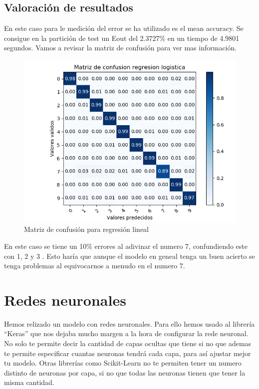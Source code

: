 \documentclass[12pt,a4paper]{article}
\begin{document}
\subsection{Valoración de resultados}
En este caso para le medición del error se ha utilizado es el mean accuracy.
Se consigue en la partición de test un Eout del 2.3727\% en un tiempo de 4.9801 segundos. Vamos a revisar la matriz de confusión para ver mas información.

\begin{figure}[H]
	\centering
	\includegraphics[width=0.7\linewidth]{../imagenesRL/matrizconfusion}
	\caption[Matriz de confusión para regresión lineal]{Matriz de confusión para regresión lineal}
	\label{fig:Matriz confusion RL}
\end{figure}

En este caso se tiene un 10\% errores al adivinar el numero 7, confundiendo este con 1, 2 y 3 . Esto haría que aunque el modelo en geneal tenga un buen acierto se tenga problemas al equivocarnos a menudo en el numero 7.


\section{Redes neuronales}
Hemos relizado un modelo con redes neuronales. Para ello hemos usado al librería ``Keras'' que nos dejaba mucho margen a la hora de configurar la rede neuronal. No solo te permite decir la cantidad de capas ocultas que tiene si no que ademas te permite especificar cuantas neuronas tendrá cada capa, para así ajustar mejor tu modelo. Otras librerías como Scikit-Learn no te permiten tener un numero distinto de neuronas por capa, si no que todas las neuronas tienen que tener la misma cantidad.
\end{document}
